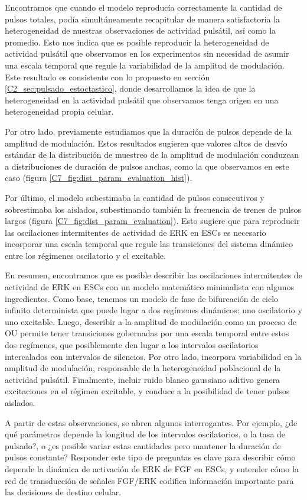 \documentclass[./main.tex]{subfiles}
\begin{document}
Encontramos que cuando el modelo reproducía correctamente la cantidad de pulsos totales, podía simultáneamente recapitular de manera satisfactoria la heterogeneidad de nuestras observaciones de actividad pulsátil, así como la promedio. Esto nos indica que es posible reproducir la heterogeneidad de actividad pulsátil que observamos en los experimentos sin necesidad de asumir una escala temporal que regule la variabilidad de la amplitud de modulación. Este resultado es consistente con lo propuesto en sección \ref{C2_sec:pulsado_estoctastico}, donde desarrollamos la idea de que la heterogeneidad en la actividad pulsátil que observamos tenga origen en una heterogeneidad propia celular.


Por otro lado, previamente estudiamos que la duración de pulsos depende de la amplitud de modulación. Estos resultados sugieren que valores altos de desvío estándar de la distribución de muestreo de la amplitud de modulación conduzcan a distribuciones de duración de pulsos anchas, como la que observamos en este caso (figura \ref{C7_fig:dist_param_evaluation_hist}). 

Por último, el modelo subestimaba la cantidad de pulsos consecutivos y sobrestimaba los aislados, subestimando también la frecuencia de trenes de pulsos largos (figura \ref{C7_fig:dist_param_evaluation}). Esto sugiere que para reproducir las oscilaciones intermitentes de actividad de ERK en ESCs es necesario incorporar una escala temporal que regule las transiciones del sistema dinámico entre los régimenes oscilatorio y el excitable. 


En resumen, encontramos que es posible describir las oscilaciones intermitentes de actividad de ERK en ESCs con un modelo matemático minimalista con algunos ingredientes. Como base, tenemos un modelo de fase de bifurcación de ciclo infinito determinista que puede lugar a dos regímenes dinámicos: uno oscilatorio y uno excitable. Luego, describir a la amplitud de modulación como un proceso de OU permite tener transiciones gobernadas por una escala temporal entre estos dos regímenes, que posiblemente den lugar a los intervalos oscilatorios intercalados con intervalos de silencios. Por otro lado, incorpora variabilidad en la amplitud de modulación, responsable de la heterogeneidad poblacional de la actividad pulsátil. Finalmente, incluir ruido blanco gaussiano aditivo genera excitaciones en el régimen excitable, y conduce a la posibilidad de tener pulsos aislados. 


A partir de estas observaciones, se abren algunos interrogantes. Por ejemplo, ¿de qué parámetros depende la longitud de los intervalos oscilatorios, o la tasa de pulsado?, o ¿es posible variar estas cantidades pero mantener la duración de pulsos constante? Responder este tipo de preguntas es clave para describir cómo depende la dinámica de activación de ERK de FGF en ESCs, y entender cómo la red de transducción de señales FGF/ERK codifica información importante para las decisiones de destino celular. 
\end{document}
